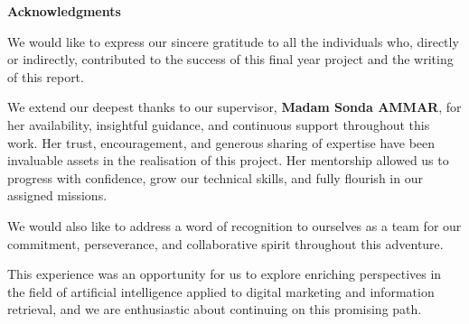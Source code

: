 \newpage
\begin{Remerciement}
\vspace*{\fill}
   \begin{center}
 \textbf{\LARGE Acknowledgments}
 \end{center}
\vspace{1cm}

\large{We would like to express our sincere gratitude to all the individuals who, directly or indirectly, contributed to the success of this final year project and the writing of this report.

We extend our deepest thanks to our supervisor, \textbf{Madam Sonda AMMAR}, for her availability, insightful guidance, and continuous support throughout this work. Her trust, encouragement, and generous sharing of expertise have been invaluable assets in the realisation of this project. Her mentorship allowed us to progress with confidence, grow our technical skills, and fully flourish in our assigned missions.

We would also like to address a word of recognition to ourselves as a team for our commitment, perseverance, and collaborative spirit throughout this adventure.

This experience was an opportunity for us to explore enriching perspectives in the field of artificial intelligence applied to digital marketing and information retrieval, and we are enthusiastic about continuing on this promising path.}




    \vspace*{\fill}
\end{Remerciement}